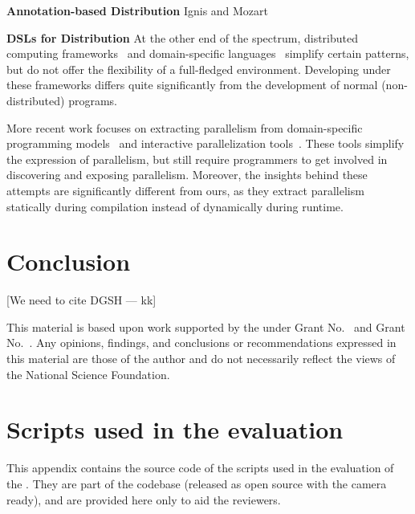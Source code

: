 \documentclass[sigplan,10pt,review,anonymous]{acmart}
\newcommand{\heading}[1]{\vspace{4pt}\noindent\textbf{#1}\enspace}
\newcommand{\kk}[1]{[{\color{magenta}#1 --- kk}]}
\begin{document}
\heading{Annotation-based Distribution}
Ignis and Mozart

\heading{DSLs for Distribution}
At the other end of the spectrum, distributed computing frameworks~\cite{mapreduce:08, ciel:11, spark:12, naiad:13, jetstream:14} and domain-specific languages~\cite{alvaro2011consistency, distal:13, meiklejohn2015lasp, psync:16, dartagnan:18}
simplify certain patterns, 
but do not offer the flexibility of a full-fledged environment.
Developing under these frameworks differs quite significantly from the development of normal (non-distributed) programs.

More recent work focuses on extracting parallelism from domain-specific programming models~\cite{cilk5, streamIt, galois} and interactive parallelization tools~\cite{parascope, ipat}.
These tools simplify the expression of parallelism, but still require programmers to get involved in discovering and exposing parallelism.
Moreover, the insights behind these attempts are significantly different from ours, as they extract parallelism statically during compilation instead of dynamically during runtime.


\section{Conclusion}
\label{discussion}

\kk{We need to cite DGSH}

\begin{acks}
  This material is based upon work supported by the
   under Grant
  No.~ and Grant
  No.~.  Any opinions, findings, and
  conclusions or recommendations expressed in this material are those
  of the author and do not necessarily reflect the views of the
  National Science Foundation.
\end{acks}





\appendix
\section{Scripts used in the evaluation}

This appendix contains the source code of the scripts used in the evaluation of
the \sys. They are part of the codebase (released as open source with the camera
ready), and are provided here only to aid the reviewers.
\end{document}
